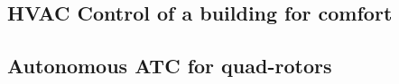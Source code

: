 \vspace{-5pt}
\subsection{HVAC Control of a building for comfort}

\vspace{-11pt}
\subsection{Autonomous ATC for quad-rotors}
\label{sec:ATCquad}

